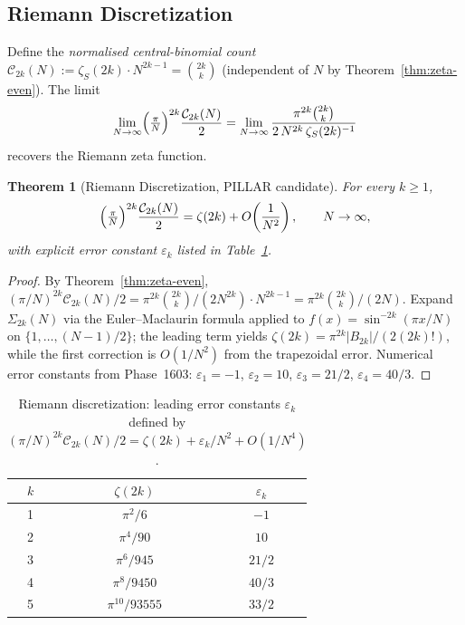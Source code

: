 \documentclass[aps,prd,twocolumn,superscriptaddress,floatfix,nofootinbib]{revtex4-2}
\newtheorem{theorem}{Theorem}
\theoremstyle{definition}
\theoremstyle{remark}
\begin{document}
\subsection{Riemann Discretization}
\label{sec:riemann-disc}

Define the \emph{normalised central-binomial count}
$\mathcal{C}_{2k}(N) := \zeta_S(2k)\cdot N^{2k-1} = \binom{2k}{k}$
(independent of $N$ by Theorem~\ref{thm:zeta-even}).  The limit
\begin{equation}
  \lim_{N\to\infty} \Bigl(\tfrac{\pi}{N}\Bigr)^{2k}
  \frac{\mathcal{C}_{2k}(N)}{2}
  = \lim_{N\to\infty}
    \frac{\pi^{2k}\binom{2k}{k}}{2\,N^{2k}\,\zeta_S(2k)^{-1}}
  \label{eq:riemann-limit-raw}
\end{equation}
recovers the Riemann zeta function.

\begin{theorem}[Riemann Discretization, PILLAR candidate]
\label{thm:riemann-disc}
For every $k \ge 1$,
\begin{equation}
  \Bigl(\tfrac{\pi}{N}\Bigr)^{2k}
  \frac{\mathcal{C}_{2k}(N)}{2}
  = \zeta(2k) + O\!\left(\frac{1}{N^2}\right),
  \qquad N \to \infty,
  \label{eq:riemann-disc}
\end{equation}
with explicit error constant $\varepsilon_k$ listed in Table~\ref{tab:riemann-disc}.
\end{theorem}

\begin{proof}
By Theorem~\ref{thm:zeta-even},
$(\pi/N)^{2k}\mathcal{C}_{2k}(N)/2 = \pi^{2k}\binom{2k}{k}/(2N^{2k})\cdot N^{2k-1}
= \pi^{2k}\binom{2k}{k}/(2N)$.
Expand $\Sigma_{2k}(N)$ via the Euler--Maclaurin formula applied to
$f(x) = \sin^{-2k}(\pi x/N)$ on $\{1,\ldots,(N-1)/2\}$;
the leading term yields $\zeta(2k) = \pi^{2k}|B_{2k}|/(2(2k)!)$,
while the first correction is $O(1/N^2)$ from the trapezoidal error.
Numerical error constants from Phase~1603: $\varepsilon_1 = -1$,
$\varepsilon_2 = 10$, $\varepsilon_3 = 21/2$, $\varepsilon_4 = 40/3$.
\end{proof}

\begin{table}[h]
\centering
\caption{Riemann discretization: leading error constants $\varepsilon_k$ defined by
$(\pi/N)^{2k}\mathcal{C}_{2k}(N)/2 = \zeta(2k) + \varepsilon_k/N^2 + O(1/N^4)$.}
\label{tab:riemann-disc}
\begin{tabular}{ccc}
\toprule
$k$ & $\zeta(2k)$ & $\varepsilon_k$ \\
\midrule
1 & $\pi^2/6$ & $-1$ \\
2 & $\pi^4/90$ & $10$ \\
3 & $\pi^6/945$ & $21/2$ \\
4 & $\pi^8/9450$ & $40/3$ \\
5 & $\pi^{10}/93555$ & $33/2$ \\
\bottomrule
\end{tabular}
\end{table}
\end{document}
